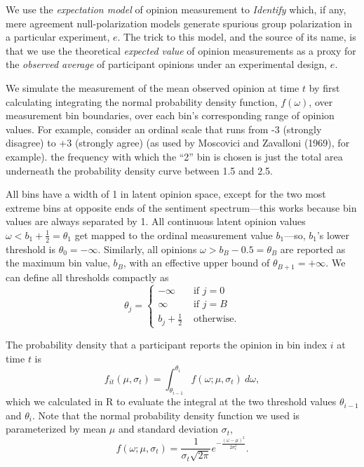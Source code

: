 \documentclass[preview]{article}
\begin{document}
We use the \emph{expectation model} of opinion measurement to
\emph{Identify} which, if any, mere agreement null-polarization models
generate spurious group polarization in a particular experiment, $e$.
The trick to this model, and the source of its name, is that we use the
theoretical \emph{expected value} of opinion measurements as a proxy for
the \emph{observed average} of participant opinions under an
experimental design, $e$.

We simulate the measurement of the mean observed opinion at time $t$
by first calculating integrating the normal probability density
function, $f(\omega)$, over measurement bin boundaries, over each
bin's corresponding range of opinion values. For example, consider an
ordinal scale that runs from -3 (strongly disagree) to +3 (strongly
agree) (as used by Moscovici and Zavalloni (1969), for example). the
frequency with which the ``2'' bin is chosen is just the total area
underneath the probability density curve between 1.5 and 2.5.

All bins have a width of 1 in latent opinion space, except for the two
most extreme bins at opposite ends of the sentiment spectrum---this
works because bin values are always separated by 1. All continuous
latent opinion values $\omega < b_1 + \frac{1}{2} = \theta_1$ get
mapped to the ordinal measurement value $b_1$---so, $b_1$'s lower
threshold is $\theta_0 = -\infty$. Similarly, all opinions
$\omega > b_B - 0.5 = \theta_B$ are reported as the maximum bin value,
$b_B$, with an effective upper bound of $\theta_{B+1} = +\infty$. We
can define all thresholds compactly as 
\begin{equation}
  \theta_j = \begin{cases}
    -\infty         & \text{ if } j=0 \\
    \infty          & \text{ if } j=B \\
    b_j + \frac{1}{2} & \text{ otherwise.}
  \end{cases}
  \label{eq:model-thresholds}
\end{equation}

The probability density that a participant reports the opinion in bin
index $i$ at time $t$ is 
\begin{equation}
  f_{it}(\mu, \sigma_t) = \int_{\theta_{i - 1}}^{\theta_{i}} f(\omega; \mu, \sigma_t)~d\omega,
  \label{eq:ordinal-frequency-value}
\end{equation}
which we calculated in R to evaluate the integral at the two
threshold values $\theta_{i-1}$ and $\theta_i$. Note that the normal
probability density function we used is parameterized by mean $\mu$
and standard deviation $\sigma_t$,
\begin{equation}
f(\omega; \mu, \sigma_t) = 
    \frac{1}{\sigma_t \sqrt{2 \pi}} e^{-\frac{(\omega - \mu)^2}{2 \sigma_t^2}}.
  \end{equation}
\end{document}
